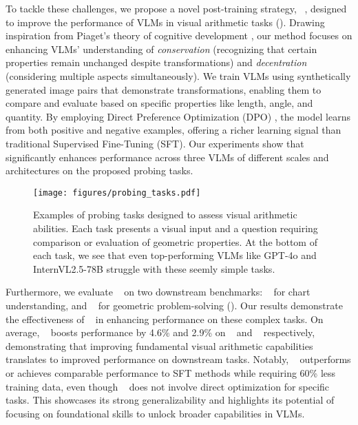 To tackle these challenges, we propose a novel post-training strategy, \method~, designed to improve the performance of VLMs in visual arithmetic tasks (). Drawing inspiration from Piaget's theory of cognitive development \cite{piaget1952origins}, our method focuses on enhancing VLMs' understanding of \textit{conservation} (recognizing that certain properties remain unchanged despite transformations) and \textit{decentration} (considering multiple aspects simultaneously). We train VLMs using synthetically generated image pairs that demonstrate transformations, enabling them to compare and evaluate based on specific properties like length, angle, and quantity. By employing Direct Preference Optimization (DPO) \cite{rafailov2023dpo}, the model learns from both positive and negative examples, offering a richer learning signal than traditional Supervised Fine-Tuning (SFT). Our experiments show that \method~ significantly enhances performance across three VLMs of different scales and architectures on the proposed probing tasks.

\begin{figure*}[t]
    \centering
    \texttt{[image: figures/probing\_tasks.pdf]}
    \vspace{-4mm}
    \caption{Examples of probing tasks designed to assess visual arithmetic abilities. Each task presents a visual input and a question requiring comparison or evaluation of geometric properties. At the bottom of each task, we see that even top-performing VLMs like GPT-4o and InternVL2.5-78B struggle with these seemly simple tasks.} %
    \vspace{-5mm}
    \label{fig:probing_tasks}
\end{figure*}

Furthermore, we evaluate \method~ on two downstream benchmarks: \chocolate~ \cite{huang-etal-2024-lvlms} for chart understanding, and \mathv~ \cite{wang2024mathv} for geometric problem-solving (). Our results demonstrate the effectiveness of \method~ in enhancing performance on these complex tasks. On average, \method~ %
boosts performance by 4.6\% and 2.9\% on \chocolate~ and \mathv~ respectively, demonstrating that improving fundamental visual arithmetic capabilities translates to improved performance on downstream tasks. Notably, \method~ outperforms or achieves comparable performance to SFT methods while requiring 60\% less training data, even though \method~ does not involve direct optimization for specific tasks. %
This showcases its strong generalizability and highlights its potential of focusing on foundational skills to unlock broader capabilities in VLMs. 


